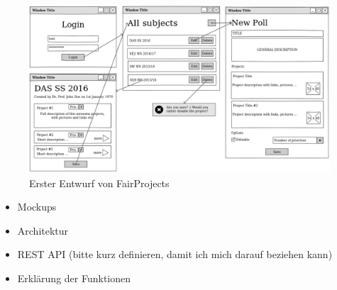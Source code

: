 \begin{figure}[t]
	\centering
	\includegraphics[width=0.7\linewidth]{figures/fairprojectsFirstDraft.png}
	\caption{Erster Entwurf von FairProjects}
	\label{f:fallstudie:firstdraft}
\end{figure}



\begin{itemize}
	\item Mockups
	\item Architektur
	\item REST API (bitte kurz definieren, damit ich mich darauf beziehen kann)
	\item Erklärung der Funktionen
\end{itemize}